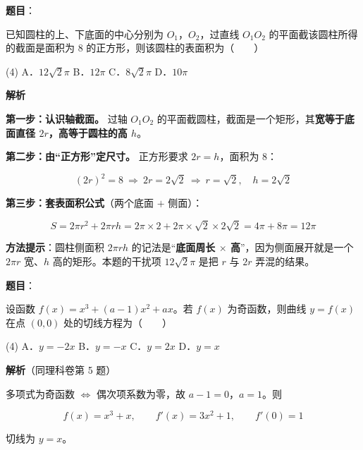 \begin{answer}

\textbf{题目}：

已知圆柱的上、下底面的中心分别为 $O_1$，$O_2$，过直线 $O_1O_2$ 的平面截该圆柱所得的截面是面积为 $8$ 的正方形，则该圆柱的表面积为\mbox{（　　）}

\begin{gkopts}(4)
\task A．$12\sqrt2\pi$
\task B．$12\pi$
\task C．$8\sqrt2\pi$
\task D．$10\pi$
\end{gkopts}

\textbf{解析}

\textbf{第一步：认识轴截面。} 过轴 $O_1O_2$ 的平面截圆柱，截面是一个矩形，其\textbf{宽等于底面直径 $2r$，高等于圆柱的高 $h$}。

\textbf{第二步：由“正方形”定尺寸。} 正方形要求 $2r=h$，面积为 $8$：

\nopagebreak[4]
\[(2r)^{2}=8\ \Longrightarrow\ 2r=2\sqrt2\ \Longrightarrow\ r=\sqrt2,\quad h=2\sqrt2\]

\textbf{第三步：套表面积公式}（两个底面 $+$ 侧面）：

\nopagebreak[4]
\[S=2\pi r^{2}+2\pi rh=2\pi\times2+2\pi\times\sqrt2\times2\sqrt2=4\pi+8\pi=12\pi\]

\begin{gktip}
\textbf{方法提示}：圆柱侧面积 $2\pi rh$ 的记法是“\textbf{底面周长 $\times$ 高}”，因为侧面展开就是一个 $2\pi r$ 宽、$h$ 高的矩形。本题的干扰项 $12\sqrt2\pi$ 是把 $r$ 与 $2r$ 弄混的结果。
\end{gktip}


\par\medskip

\end{answer}
\begin{answer}

\textbf{题目}：

设函数 $f(x)=x^{3}+(a-1)x^{2}+ax$。若 $f(x)$ 为奇函数，则曲线 $y=f(x)$ 在点 $(0,0)$ 处的切线方程为\mbox{（　　）}

\begin{gkopts}(4)
\task A．$y=-2x$
\task B．$y=-x$
\task C．$y=2x$
\task D．$y=x$
\end{gkopts}

\textbf{解析}（同理科卷第 5 题）

多项式为奇函数 $\iff$ 偶次项系数为零，故 $a-1=0$，$a=1$。则

\nopagebreak[4]
\[f(x)=x^{3}+x,\qquad f'(x)=3x^{2}+1,\qquad f'(0)=1\]

切线为 $y=x$。

\par\medskip

\Needspace{0.4\textheight}


\end{answer}

